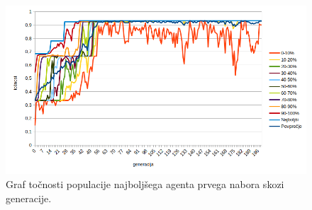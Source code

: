 %

\begin{figure}[H]
    \begin{center}
        \includegraphics[width=13cm]{iris/1/acc}
    \end{center}
    \caption{Graf točnosti populacije najboljšega agenta prvega nabora skozi generacije.}
    \label{fig:iris_acc_1}
\end{figure}

